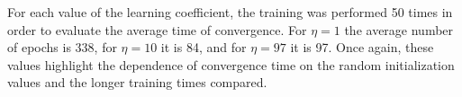 \documentclass[12pt]{article}
\begin{document}
For each value of the learning coefficient, the training was performed 50 times in order to evaluate the average time of convergence.
For $\eta=1$ the average number of epochs is 338, for $\eta=10$ it is 84, and for $\eta=97$ it is 97.
Once again, these values highlight the dependence of convergence time on the random initialization values and the longer training times compared.
\end{document}
